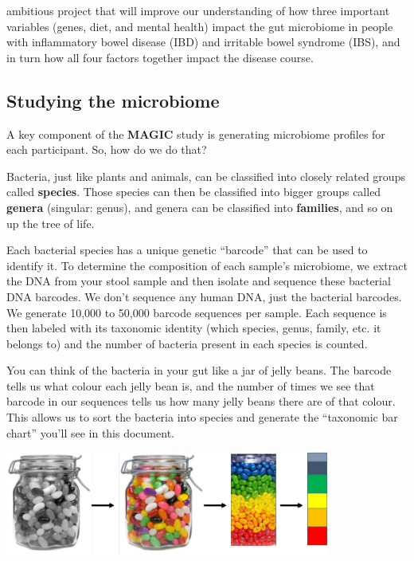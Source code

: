 \documentclass[
]{article}
\begin{document}
ambitious project that will improve our understanding of how three
important variables (genes, diet, and mental health) impact the gut
microbiome in people with inflammatory bowel disease (IBD) and irritable
bowel syndrome (IBS), and in turn how all four factors together impact
the disease course.

\subsection{Studying the microbiome}

A key component of the \textbf{\color{Cerulean}MAGIC} study is
generating microbiome profiles for each participant. So, how do we do
that?

Bacteria, just like plants and animals, can be classified into closely
related groups called \textbf{species}. Those species can then be
classified into bigger groups called \textbf{genera} (singular: genus),
and genera can be classified into \textbf{families}, and so on up the
tree of life.

Each bacterial species has a unique genetic ``barcode'' that can be used
to identify it. To determine the composition of each sample's
microbiome, we extract the DNA from your stool sample and then isolate
and sequence these bacterial DNA barcodes. We don't sequence any human
DNA, just the bacterial barcodes. We generate 10,000 to 50,000 barcode
sequences per sample. Each sequence is then labeled with its taxonomic
identity (which species, genus, family, etc. it belongs to) and the
number of bacteria present in each species is counted.

You can think of the bacteria in your gut like a jar of jelly beans. The
barcode tells us what colour each jelly bean is, and the number of times
we see that barcode in our sequences tells us how many jelly beans there
are of that colour. This allows us to sort the bacteria into species and
generate the ``taxonomic bar chart'' you'll see in this document.

\begin{center}
\includegraphics[width=0.8\textwidth]{img/jellybeans.png}
\end{center}
\end{document}
